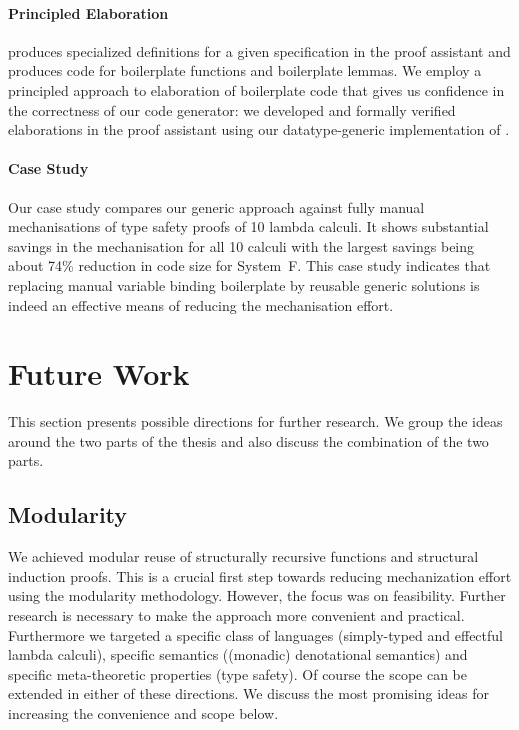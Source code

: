 \paragraph{Principled Elaboration}
\Needle produces specialized definitions for a given \Knot specification in the
\Coq proof assistant and produces code for boilerplate functions and boilerplate
lemmas. We employ a principled approach to elaboration of boilerplate code that
gives us confidence in the correctness of our code generator: we developed and
formally verified elaborations in the \Coq proof assistant using our
datatype-generic implementation \Loom of \Knot.

\paragraph{Case Study}
Our case study compares our generic approach against fully manual mechanisations
of type safety proofs of 10 lambda calculi. It shows substantial savings in the
mechanisation for all 10 calculi with the largest savings being about 74\%
reduction in code size for System~F. This case study indicates that replacing
manual variable binding boilerplate by reusable generic solutions is indeed an
effective means of reducing the mechanisation effort.


\section{Future Work}

This section presents possible directions for further research. We group the
ideas around the two parts of the thesis and also discuss the combination of the
two parts.

\subsection{Modularity}

We achieved modular reuse of structurally recursive functions and structural
induction proofs. This is a crucial first step towards reducing mechanization
effort using the modularity methodology. However, the focus was on feasibility.
Further research is necessary to make the approach more convenient and
practical. Furthermore we targeted a specific class of languages (simply-typed
and effectful lambda calculi), specific semantics ((monadic) denotational
semantics) and specific meta-theoretic properties (type safety). Of course the
scope can be extended in either of these directions. We discuss the most
promising ideas for increasing the convenience and scope below.

